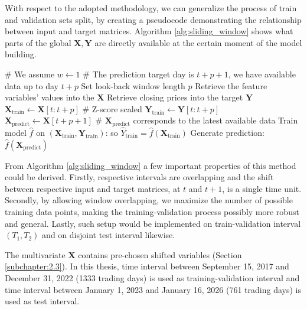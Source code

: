 With respect to the adopted methodology, we can generalize the process of train and validation sets split, by creating a pseudocode demonstrating the relationship
between input and target matrices. Algorithm \ref{alg:sliding_window} shows what parts of the global $\mathbf{X}, \mathbf{Y}$ are directly available at the certain moment of the model building.
\begin{algorithm}[H]
\caption{Rolling-window on $(T_1, T_2)$ interval}
\label{alg:sliding_window}
\begin{algorithmic}
\State \# We assume $w \gets 1$
\State \# The prediction target day is $t+p+1$, we have available data up to day $t+p$
\State Set look-back window length $p$ 
\State Retrieve the feature variables' values into the $\mathbf{X}$
    \State Retrieve closing prices into the target $\mathbf{Y}$
        \State $\mathbf{X}_{\text{train}} \gets \mathbf{X}[t : t+p]$  \>\>\>\>\>\>\> \# Z-score scaled
        \State $\mathbf{Y}_{\text{train}} \gets \mathbf{Y}[t : t+p]$
        \State $\mathbf{X}_{\text{predict}} \gets \mathbf{X}[t+p+1]$ 
        \State \# $\mathbf{X}_\text{predict}$ corresponds to the latest available data 
        \State Train model $\hat{f}$ on $(\mathbf{X}_{\text{train}}, \mathbf{Y}_{\text{train}})$: so $\hat{Y}_{\text{train}}=\hat{f}(\mathbf{X}_{\text{train}})$ 
        \State Generate prediction: $\hat{f}(\mathbf{X}_{\text{predict}})$
    \EndFor
\EndFor
\end{algorithmic}
\end{algorithm}
\label{testing_sub}
From Algorithm \ref{alg:sliding_window} a few important properties of this method could be derived.
Firstly, respective intervals are overlapping and the shift between respective input and target matrices, at $t$ and $t+1$,
is a single time unit. Secondly, by allowing window overlapping, we maximize the number of possible training data points, 
making the training-validation process possibly more robust and general. Lastly, such setup would be implemented on train-validation interval $(T_1, T_2)$ and
on disjoint test interval likewise.

The multivariate $\mathbf{X}$ contains pre-chosen shifted variables (Section \ref{subchapter:2.3}). In this thesis, time interval between September 15, 2017 and December 31, 2022 (1333 trading days)
is used as training-validation interval and time interval between January 1, 2023 and January 16, 2026 (761 trading days) is used as test interval.

